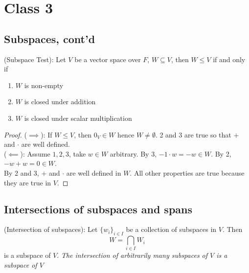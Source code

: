 \section{Class 3}

\subsection{Subspaces, cont'd}
\begin{proposition}
(Subspace Test): Let $V$ be a vector space over $F$, $W \subseteq V$, then $W \leq V$ if and only if 
\begin{enumerate}
    \item $W$ is non-empty
    \item $W$ is closed under addition
    \item $W$ is closed under scalar multiplication
\end{enumerate}
\end{proposition}

\begin{proof}
($\implies$):  If $W \leq V$, then $0_V \in W$ hence $W \neq \emptyset$. 2 and 3 are true so that $+$ and $\cdot$ are well defined. \\

($\impliedby$): Assume $1, 2, 3$, take $w \in W$ arbitrary. By 3, $-1 \cdot w = -w \in W$. By 2, $-w + w = 0 \in W$.  \\

By 2 and 3, $+$ and $\cdot$ are well defined in $W$. All other properties are true because they are true in $V$. 
\end{proof}

\subsection{Intersections of subspaces and spans}
\begin{theorem}
(Intersection of subspaces): Let $\{ w_i \}_{i \in I} $ be a collection of subspaces in $V$. Then 
\[
  W = \bigcap_{i \in I}W_i 
\]
is a subspace of $V$. 
\textit{The intersection of arbitrarily many subspaces of $V$ is a subspace of $V$}
\end{theorem}

